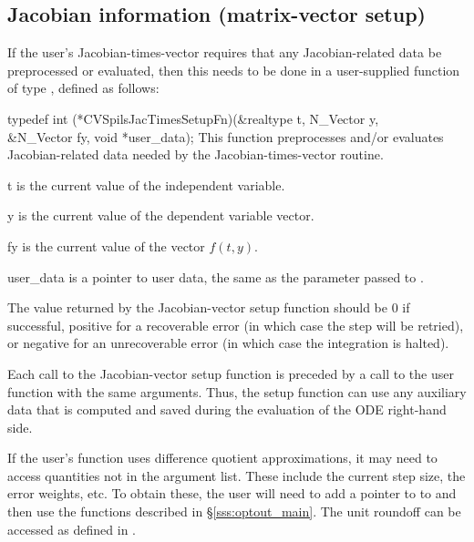 \subsection{Jacobian information (matrix-vector setup)}\label{ss:jtsetupFn}

If the user's Jacobian-times-vector requires that any Jacobian-related data
be preprocessed or evaluated, then this needs to be done in a
user-supplied function of type , defined as follows:

{
  typedef int (*CVSpilsJacTimesSetupFn)(&realtype t, N\_Vector y, \\
                                        &N\_Vector fy, void *user\_data);
}
{
  This function preprocesses and/or evaluates Jacobian-related data needed
  by the Jacobian-times-vector routine.
}
{
  \begin{args}
  \item[t]
    is the current value of the independent variable.
  \item[y]
    is the current value of the dependent variable vector.
  \item[fy]
    is the current value of the vector $f(t,y)$.
  \item[user\_data]
    is a pointer to user data, the same as the 
    parameter passed to .
  \end{args}
}
{
  The value returned by the Jacobian-vector setup function
  should be $0$ if successful, positive for a recoverable error (in
  which case the step will be retried), or negative for an
  unrecoverable error (in which case the integration is halted). }
{
  Each call to the Jacobian-vector setup function is preceded by a call to
  the  user function with the same  arguments.
  Thus, the setup function can use any auxiliary data that is computed
  and saved during the evaluation of the ODE right-hand side.

  If the user's  function uses difference quotient
  approximations, it may need to access quantities not in the argument
  list. These include the current step size, the error weights, etc.
  To obtain these, the user will need to add a pointer to 
  to  and then use the  functions described in
  \S\ref{sss:optout_main}. The unit roundoff can be accessed as
   defined in .
}


